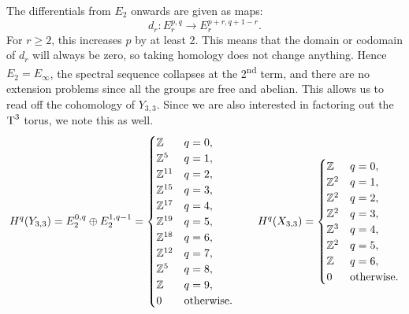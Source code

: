 The differentials from $E_2$ onwards are given as maps:
\[ d_r : E_r^{p,q} \to E_r^{p+r,q+1-r}. \]
For $r\geq 2$, this increases $p$ by at least 2. This means that
the domain or codomain of $d_r$ will always be zero, so taking
homology does not change anything. Hence $E_2 = E_\infty$, the
spectral sequence collapses at the 2\textsuperscript{nd} term, and
there are no extension problems since all the groups are free and
abelian. This allows us to read off the cohomology of $Y_{3,3}$. Since
we are also interested in factoring out the $\operatorname{T}^3$ torus, we note this
as well.
\[ H^q(Y_{3,3}) = E_2^{0,q} \oplus E_2^{1,q-1} = 
\begin{cases}
  \mathbb{Z} & q = 0, \\
  \mathbb{Z}^{5} & q = 1,\\
  \mathbb{Z}^{11} & q = 2,\\
  \mathbb{Z}^{15} & q = 3,\\
  \mathbb{Z}^{17} & q = 4,\\
  \mathbb{Z}^{19} & q = 5,\\
  \mathbb{Z}^{18} & q = 6,\\
  \mathbb{Z}^{12} & q = 7,\\
  \mathbb{Z}^{5} & q = 8,\\
  \mathbb{Z} & q = 9,\\
  0 & \text{otherwise}.
\end{cases} \qquad
H^q(X_{3,3}) =
\begin{cases}
  \mathbb{Z} & q = 0, \\
  \mathbb{Z}^{2} & q=1, \\
  \mathbb{Z}^{2} & q=2, \\
  \mathbb{Z}^{2} & q=3, \\
  \mathbb{Z}^{3} & q=4, \\
  \mathbb{Z}^{2} & q=5, \\
  \mathbb{Z} & q=6, \\
  0 & \text{otherwise}.
\end{cases}
\]

